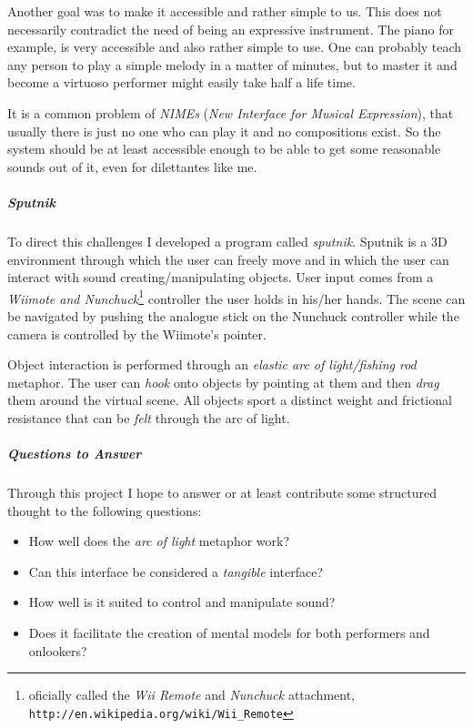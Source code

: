 \documentclass[10pt,a4paper]{scrartcl}
\begin{document}
Another goal was to make it accessible and rather simple to us. This does not necessarily contradict the need of being an expressive instrument. The piano for example, is very accessible and also rather simple to use. One can probably teach any person to play a simple melody in a matter of minutes, but to master it and become a virtuoso performer might easily take half a life time.

It is a common problem of \emph{NIMEs} (\emph{New Interface for Musical Expression}), that usually there is just no one who can play it and no compositions exist. \cite{Dobrian2006} So the system should be at least accessible enough to be able to get some reasonable sounds out of it, even for dilettantes like me.


\subparagraph{Sputnik}
To direct this challenges I developed a program called \emph{sputnik}. Sputnik is a 3D environment through which the user can freely move and in which the user can interact with sound creating/manipulating objects. User input comes from a \emph{Wiimote and Nunchuck}\footnote{oficially called the \emph{Wii Remote} and \emph{Nunchuck} attachment,\\ \texttt{http://en.wikipedia.org/wiki/Wii\_Remote}} controller the user holds in his/her hands. The scene can be navigated by pushing the analogue stick on the Nunchuck controller while the camera is controlled by the Wiimote's pointer.

Object interaction is performed through an \emph{elastic arc of light/fishing rod} metaphor. The user can \emph{hook} onto objects by pointing at them and then \emph{drag} them around the virtual scene. All objects sport a distinct weight and frictional resistance that can be \emph{felt} through the arc of light.


\subparagraph{Questions to Answer}
Through this project I hope to answer or at least contribute some structured thought to the following questions:

\begin{itemize}
\item How well does the \emph{arc of light} metaphor work?
\item Can this interface be considered a \emph{tangible} interface?
\item How well is it suited to control and manipulate sound?
\item Does it facilitate the creation of mental models for both performers and onlookers?
\end{itemize}
\end{document}
